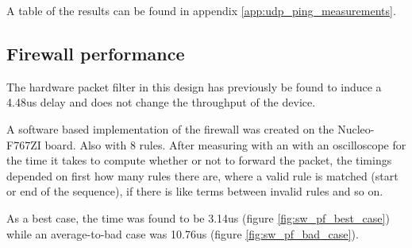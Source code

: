A table of the results can be found in appendix \ref{app:udp_ping_measurements}.

\subsection{Firewall performance}

The hardware packet filter in this design has previously be found to induce a 4.48us delay and does not change the throughput of the device. 

A software based implementation of the firewall was created on the Nucleo-F767ZI board. Also with 8 rules. After measuring with an with an oscilloscope for the time it takes to compute whether or not to forward the packet, the timings depended on first how many rules there are, where a valid rule is matched (start or end of the sequence), if there is like terms between invalid rules and so on. 

As a best case, the time was found to be 3.14us (figure \ref{fig:sw_pf_best_case}) while an average-to-bad case was 10.76us (figure \ref{fig:sw_pf_bad_case}).



